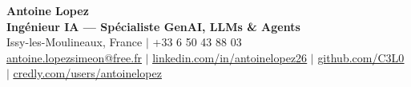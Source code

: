 \documentclass[letterpaper,10pt]{article}
\begin{document}
\begin{center}
    {\Huge \textbf{Antoine Lopez}} \\ \vspace{2pt}
    {\large \textbf{Ingénieur IA — Spécialiste GenAI, LLMs \& Agents}} \\ \vspace{3pt}
    \small
    Issy-les-Moulineaux, France $|$ +33 6 50 43 88 03 \\
    \href{mailto:antoine.lopezsimeon@free.fr}{\underline{antoine.lopezsimeon@free.fr}} $|$ 
    \href{https://linkedin.com/in/antoinelopez26}{\underline{linkedin.com/in/antoinelopez26}} $|$
    \href{https://github.com/C3L0}{\underline{github.com/C3L0}} $|$
    \href{https://www.credly.com/users/antoinelopez26}{\underline{credly.com/users/antoinelopez}}
\end{center}

\vspace{-10pt}







\end{document}
